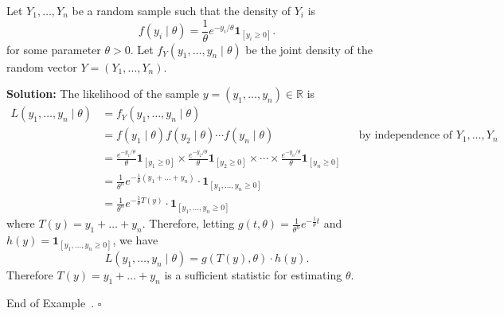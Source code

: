 \documentclass[10pt]{article}
\theoremstyle{definition}
\newtheorem{example}[theorem]{Example}
\renewenvironment{example}
{\begin{oldexample}}
  {\par\smallskip\hfill   End of Example~\theexample. $\square$    \par\end{oldexample}}
\newcommand{\vt}{\vskip 5mm} %
\newcommand{\Fl}{\vt\noindent\textbf} %
\newcommand{\1}[1]{\textbf{1}_{\left[#1\right]}} %
\def\R{\mathbb{R}} %
\begin{document}
\begin{example}
  Let $Y_{1},\ldots,Y_{n}$ be a random sample such that the density of $Y_{i}$
  is 
  \begin{equation*}
    f(y_{i}\mid \theta) = \frac{1}{\theta}e^{-y_{i}/\theta}\mathbf{1}_{\left[y_{i}\geq 0\right]}.
  \end{equation*}
  for some parameter $\theta>0$. Let $f_{Y}(y_{1},\ldots,y_{n}\mid \theta)$ be the joint
  density of the random vector $Y=(Y_{1},\ldots,Y_{n})$.
  
  \Fl{Solution:} The likelihood of the sample $y=(y_{1},\ldots,y_{n})\in \R$
  is
  \begin{align*}
    L(y_{1},\ldots,y_{n}\mid \theta)
    &= f_{Y}(y_{1},\ldots,y_{n}\mid \theta)\\
    &= f(y_{1}\mid \theta)f(y_{2}\mid \theta)\cdots f(y_{n}\mid \theta) &&\text{by independence
                                                        of $Y_{1},\ldots,Y_{n}$ }\\
    &= \frac{e^{-y_{1}/\theta}}{\theta} \mathbf{1}_{\left[ y_{1}\geq 0\right] }\times \frac{e^{-y_{2}/\theta}}{\theta}\mathbf{1}_{\left[ y_{2}\geq 0\right] }\times \cdots\times \frac{e^{-y_{n}/\theta}}{\theta} \mathbf{1}_{\left[ y_{n}\geq 0\right] }\\
    &= \frac{1}{\theta^{n}}e^{-\frac{1}{\theta}(y_{1}+\ldots+y_{n})} \cdot \mathbf{1}_{\left[ y_{1},\ldots,y_{n}\geq 0\right] }\\
    &= \frac{1}{\theta^{n}}e^{-\frac{1}{\theta}T(y)} \cdot \mathbf{1}_{\left[ y_{1},\ldots,y_{n}\geq 0\right]}
  \end{align*}
  where $T(y)= y_{1}+\ldots+y_{n}$. Therefore, letting $g(t,\theta) =
  \frac{1}{\theta^{n}}e^{-\frac{1}{\theta}t}$ and $h(y)=\mathbf{1}_{\left[
      y_{1},\ldots,y_{n}\geq 0\right] }$, we have
  \begin{equation*}
    L(y_{1},\ldots,y_{n}\mid \theta) = g(T(y),\theta)\cdot h(y).
  \end{equation*}
  Therefore $T(y) = y_{1}+\ldots+y_{n}$ is a sufficient statistic for
  estimating $\theta$.
\end{example}
\end{document}
